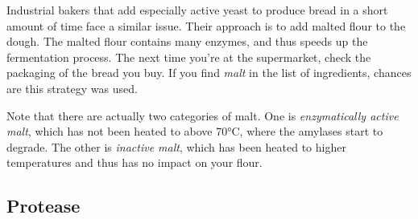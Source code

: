 Industrial bakers that add especially active yeast to produce bread
in a short amount of time face a similar issue. Their approach is to
add malted flour to the dough. The malted flour contains many enzymes,
and thus speeds up the fermentation process. The next time you're at the
supermarket, check the packaging of the bread you buy. If you find
{\it malt} in the list of ingredients, chances are this strategy was
used.

Note that there are actually two categories of malt. One is
{\it enzymatically active malt}, which has not been heated to above 70°C,
where the amylases start to degrade. The other is {\it inactive malt},
which has been heated to higher temperatures and thus has no impact on
your flour.

\subsection{Protease}

